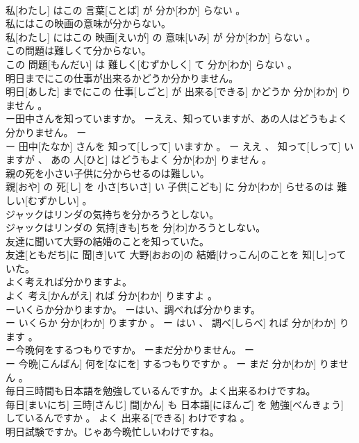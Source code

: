 \documentclass[8pt]{extreport}
\begin{document}
\begin{CJK}{UTF8}{min}
\\	私[わたし] はこの 言葉[ことば] が 分か[わか] らない 。
\\	私にはこの映画の意味が分からない。	
\\	私[わたし] にはこの 映画[えいが] の 意味[いみ] が 分か[わか] らない 。
\\	この問題は難しくて分からない。	
\\	この 問題[もんだい] は 難しく[むずかしく] て 分か[わか] らない 。
\\	明日までにこの仕事が出来るかどうか分かりません。	
\\	明日[あした] までにこの 仕事[しごと] が 出来る[できる] かどうか 分か[わか] りません 。
\\	ー田中さんを知っていますか。 ーええ、知っていますが、あの人はどうもよく分かりません。	ー
\\	ー 田中[たなか] さんを 知って[しって] いますか 。 ー ええ 、 知って[しって] いますが 、 あの 人[ひと] はどうもよく 分か[わか] りません 。
\\	親の死を小さい子供に分からせるのは難しい。	
\\	親[おや] の 死[し] を 小さ[ちいさ] い 子供[こども] に 分か[わか] らせるのは 難しい[むずかしい] 。
\\	ジャックはリンダの気持ちを分かろうとしない。	
\\	ジャックはリンダの 気持[きも]ちを 分[わ]かろうとしない。
\\	友達に聞いて大野の結婚のことを知っていた。	
\\	友達[ともだち]に 聞[き]いて 大野[おおの]の 結婚[けっこん]のことを 知[し]っていた。
\\	よく考えれば分かりますよ。	
\\	よく 考え[かんがえ] れば 分か[わか] りますよ 。
\\	ーいくらか分かりますか。 ーはい、調べれば分かります。	
\\	ー いくらか 分か[わか] りますか 。 ー はい 、 調べ[しらべ] れば 分か[わか] ります 。
\\	ー今晩何をするつもりですか。 ーまだ分かりません。	ー
\\	ー 今晩[こんばん] 何を[なにを] するつもりですか 。 ー まだ 分か[わか] りません 。
\\	毎日三時間も日本語を勉強しているんですか。よく出来るわけですね。	
\\	毎日[まいにち] 三時[さんじ] 間[かん] も 日本語[にほんご] を 勉強[べんきょう] しているんですか 。 よく 出来る[できる] わけですね 。
\\	明日試験ですか。じゃあ今晩忙しいわけですね。	

\end{CJK}
\end{document}
